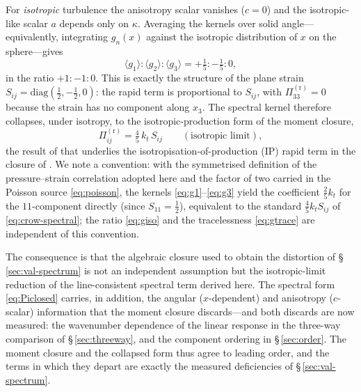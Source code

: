 \documentclass[lineno]{JFM-FLM_Au}
\newcounter{assumption}
\begin{document}
For \emph{isotropic} turbulence the anisotropy scalar vanishes ($c=0$) and the
isotropic-like scalar $a$ depends only on $\kappa$. Averaging the kernels over
solid angle---equivalently, integrating $g_n(x)$ against the isotropic
distribution of $x$ on the sphere---gives
\begin{equation}
  \langle g_1\rangle : \langle g_2\rangle : \langle g_3\rangle
  = +\tfrac15 : -\tfrac15 : 0,
  \label{eq:giso}
\end{equation}
in the ratio $+1:-1:0$. This is exactly the structure of the plane strain
$S_{ij}=\mathrm{diag}(\tfrac12,-\tfrac12,0)$: the rapid term is proportional to
$S_{ij}$, with $\Pi^{(\mathrm r)}_{33}=0$ because the strain has no component
along $x_3$. The spectral kernel therefore collapses, under isotropy, to the
isotropic-production form of the moment closure,
\begin{equation}
  \Pi^{(\mathrm r)}_{ij}
  = \tfrac{4}{5}\,k_t\,S_{ij}
  \qquad(\text{isotropic limit}),
  \label{eq:crow-spectral}
\end{equation}
the result of \citet{Crow1968} that underlies the isotropisation-of-production
(IP) rapid term in the closure of \citet{LaunderReeceRodi1975}. We note a
convention: with the symmetrised definition of the pressure--strain correlation
adopted here and the factor of two carried in the Poisson source
\eqref{eq:poisson}, the kernels \eqref{eq:g1}--\eqref{eq:g3} yield the
coefficient $\tfrac25 k_t$ for the $11$-component directly (since $S_{11}=\tfrac12$),
equivalent to the standard $\tfrac45 k_t S_{ij}$ of \eqref{eq:crow-spectral}; the ratio
\eqref{eq:giso} and the tracelessness \eqref{eq:gtrace} are independent of this
convention.

The consequence is that the algebraic closure used to obtain the distortion of
\S\,\ref{sec:val-spectrum} is not an independent assumption but the
isotropic-limit reduction of the line-consistent spectral term derived here.
The spectral form \eqref{eq:Piclosed} carries, in addition, the angular
($x$-dependent) and anisotropy ($c$-scalar) information that the moment closure
discards---and both discards are now measured: the wavenumber dependence
of the linear response in the three-way comparison of
\S\,\ref{sec:threeway}, and the component ordering in
\S\,\ref{sec:order}. The moment closure and the collapsed form thus
agree to leading order, and the terms in which they depart are exactly
the measured deficiencies of \S\,\ref{sec:val-spectrum}.
\end{document}
